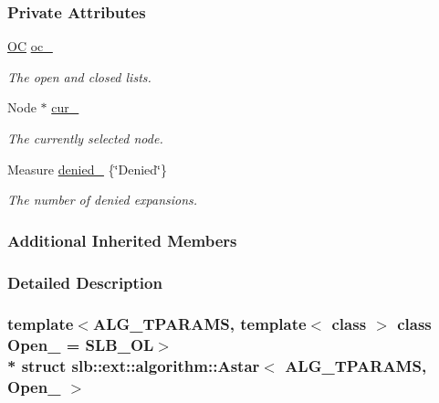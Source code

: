 \subsubsection*{Private Attributes}
\begin{DoxyCompactItemize}
\item 
\hyperlink{structslb_1_1ext_1_1algorithm_1_1Astar_a7c221266394f6833a6f5aadb0f76315d}{OC} \hyperlink{structslb_1_1ext_1_1algorithm_1_1Astar_a67914aa334ddbb3530ffc21190709e5d}{oc\+\_\+}\hypertarget{structslb_1_1ext_1_1algorithm_1_1Astar_a67914aa334ddbb3530ffc21190709e5d}{}\label{structslb_1_1ext_1_1algorithm_1_1Astar_a67914aa334ddbb3530ffc21190709e5d}

\begin{DoxyCompactList}\small\item\em The open and closed lists. \end{DoxyCompactList}\item 
Node $\ast$ \hyperlink{structslb_1_1ext_1_1algorithm_1_1Astar_a92032cb21d6d47bb3c66b3e261220b93}{cur\+\_\+}\hypertarget{structslb_1_1ext_1_1algorithm_1_1Astar_a92032cb21d6d47bb3c66b3e261220b93}{}\label{structslb_1_1ext_1_1algorithm_1_1Astar_a92032cb21d6d47bb3c66b3e261220b93}

\begin{DoxyCompactList}\small\item\em The currently selected node. \end{DoxyCompactList}\item 
Measure \hyperlink{structslb_1_1ext_1_1algorithm_1_1Astar_a205d1811287b6fe7f7d8f19b37b0f667}{denied\+\_\+} \{\char`\"{}Denied\char`\"{}\}\hypertarget{structslb_1_1ext_1_1algorithm_1_1Astar_a205d1811287b6fe7f7d8f19b37b0f667}{}\label{structslb_1_1ext_1_1algorithm_1_1Astar_a205d1811287b6fe7f7d8f19b37b0f667}

\begin{DoxyCompactList}\small\item\em The number of denied expansions. \end{DoxyCompactList}\end{DoxyCompactItemize}
\subsubsection*{Additional Inherited Members}


\subsubsection{Detailed Description}
\subsubsection*{template$<$A\+L\+G\+\_\+\+T\+P\+A\+R\+A\+MS, template$<$ class $>$ class Open\+\_\+ = S\+L\+B\+\_\+\+OL$>$\\*
struct slb\+::ext\+::algorithm\+::\+Astar$<$ A\+L\+G\+\_\+\+T\+P\+A\+R\+A\+M\+S, Open\+\_\+ $>$}

